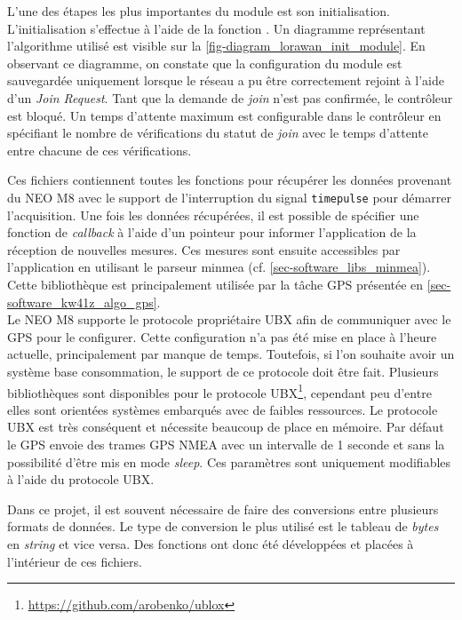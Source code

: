 L'une des étapes les plus importantes du module est son initialisation. L'initialisation s'effectue à l'aide de la fonction . Un diagramme représentant l'algorithme utilisé est visible sur la \cref{fig-diagram_lorawan_init_module}. En observant ce diagramme, on constate que la configuration du module est sauvegardée uniquement lorsque le réseau a pu être correctement rejoint à l'aide d'un \textit{Join Request}. Tant que la demande de \textit{join} n'est pas confirmée, le contrôleur est bloqué. Un temps d'attente maximum est configurable dans le contrôleur en spécifiant le nombre de vérifications du statut de \textit{join} avec le temps d'attente entre chacune de ces vérifications.

 \label{sec-software_libs_neom8}

Ces fichiers contiennent toutes les fonctions pour récupérer les données provenant du NEO M8 avec le support de l'interruption du signal \texttt{timepulse} pour démarrer l'acquisition. Une fois les données récupérées, il est possible de spécifier une fonction de \textit{callback} à l'aide d'un pointeur pour informer l'application de la réception de nouvelles mesures. Ces mesures sont ensuite accessibles par l'application en utilisant le parseur minmea (cf. \cref{sec-software_libs_minmea}). Cette bibliothèque est principalement utilisée par la tâche GPS présentée en \cref{sec-software_kw41z_algo_gps}.\\


Le NEO M8 supporte le protocole propriétaire UBX afin de communiquer avec le GPS pour le configurer. Cette configuration n'a pas été mise en place à l'heure actuelle, principalement par manque de temps. Toutefois, si l'on souhaite avoir un système base consommation, le support de ce protocole doit être fait. Plusieurs bibliothèques sont disponibles pour le protocole UBX\footnote{\url{https://github.com/arobenko/ublox}}, cependant peu d'entre elles sont orientées systèmes embarqués avec de faibles ressources. Le protocole UBX est très conséquent et nécessite beaucoup de place en mémoire. Par défaut le GPS envoie des trames GPS NMEA avec un intervalle de 1 seconde et sans la possibilité d'être mis en mode \textit{sleep}. Ces paramètres sont uniquement modifiables à l'aide du protocole UBX.


Dans ce projet, il est souvent nécessaire de faire des conversions entre plusieurs formats de données. Le type de conversion le plus utilisé est le tableau de \textit{bytes} en \textit{string} et vice versa. Des fonctions ont donc été développées et placées à l'intérieur de ces fichiers.


